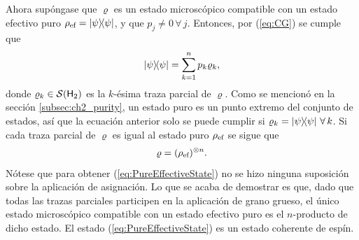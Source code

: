 Ahora supóngase que $\varrho$ es un estado microscópico compatible con un estado efectivo puro $\rho_{\ef}=\dyad{\psi}$, y que $p_{j}\neq 0\,\forall\,j$. Entonces, por (\ref{eq:CG}) se cumple que
\begin{equation}
    \dyad{\psi}=\sum_{k=1}^{n}p_{k}\varrho_{k},\nonumber
\end{equation}
donde $\varrho_{k}\in\mathcal{S}({\sf H}_{2})$ es la $k$-ésima traza parcial de $\varrho$. Como se mencionó en la sección \ref{subsec:ch2_purity}, un estado puro es un punto extremo del conjunto de estados, así que la ecuación anterior solo se puede cumplir si $\varrho_{k}=\dyad{\psi}\,\forall\,k$.  Si cada traza parcial de $\varrho$ es igual al estado puro $\rho_{\text{ef}}$ se sigue que
\begin{equation}\label{eq:PureEffectiveState}
    \varrho=(\rho_{\text{ef}})^{\otimes n}.
\end{equation}
Nótese que para obtener (\ref{eq:PureEffectiveState}) no se hizo ninguna suposición sobre la aplicación de asignación. Lo que se acaba de demostrar es que, dado que todas las trazas parciales participen en la aplicación de grano grueso, el único estado microscópico compatible con un estado efectivo puro es el $n$-producto de dicho estado. El estado (\ref{eq:PureEffectiveState}) es un estado coherente de espín.
